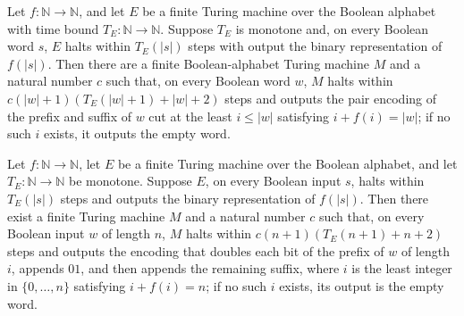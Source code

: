 \begin{lemma}
\label{Turing.FinTM.emitterP2_closed}
\leanok
{}
Let $f:\mathbb N\to\mathbb N$, and let $E$ be a finite Turing machine over the Boolean
alphabet with time bound $T_E:\mathbb N\to\mathbb N$. Suppose $T_E$ is monotone and, on
every Boolean word $s$, $E$ halts within $T_E(|s|)$ steps with output the binary
representation of $f(|s|)$. Then there are a finite Boolean-alphabet Turing machine $M$
and a natural number $c$ such that, on every Boolean word $w$, $M$ halts within
$c(|w|+1)(T_E(|w|+1)+|w|+2)$ steps and outputs the pair encoding of the prefix and
suffix of $w$ cut at the least $i\le |w|$ satisfying $i+f(i)=|w|$; if no such $i$
exists, it outputs the empty word.
\end{lemma}

\begin{theorem}
\label{Turing.FinTM.computesFunInTime_splitSolveWith}
\leanok
{}
Let $f:\mathbb{N}\to\mathbb{N}$, let $E$ be a finite Turing machine over the Boolean
alphabet, and let $T_E:\mathbb{N}\to\mathbb{N}$ be monotone. Suppose $E$, on every
Boolean input $s$, halts within $T_E(|s|)$ steps and outputs the binary representation
of $f(|s|)$. Then there exist a finite Turing machine $M$ and a natural number $c$ such
that, on every Boolean input $w$ of length $n$, $M$ halts within $c(n+1)(T_E(n+1)+n+2)$
steps and outputs the encoding that doubles each bit of the prefix of $w$ of length $i$,
appends $01$, and then appends the remaining suffix, where $i$ is the least integer in
$\{0,\ldots,n\}$ satisfying $i+f(i)=n$; if no such $i$ exists, its output is the empty
word.
\end{theorem}

